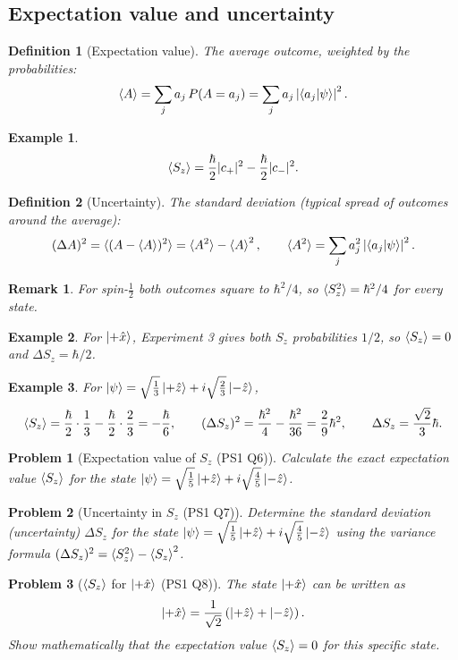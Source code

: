 \documentclass{article}
\newtheorem{definition}{Definition}
\newtheorem{problem}{Problem}
\newtheorem*{example}{Example}
\newtheorem{remark}{Remark}
\begin{document}
\subsection{Expectation value and uncertainty}
\begin{definition}[Expectation value]
    The average outcome, weighted by the probabilities:
    \begin{equation}
        \braket{A} = \sum_j a_j\,P(A = a_j) = \sum_j a_j\left|\braket{a_j|\psi}\right|^2.
    \end{equation}
\end{definition}
\begin{example}
    \[\braket{S_z} = \frac{\hbar}{2}|c_+|^2 - \frac{\hbar}{2}|c_-|^2.\]
\end{example}
\begin{definition}[Uncertainty]
    The standard deviation (typical spread of outcomes around the average):
    \begin{equation}
        (\Delta A)^2 = \braket{(A - \braket{A})^2} = \braket{A^2} - \braket{A}^2, \qquad \braket{A^2} = \sum_j a_j^2\left|\braket{a_j|\psi}\right|^2.
    \end{equation}
\end{definition}
\begin{remark}
    For spin-$\tfrac12$ both outcomes square to $\hbar^2/4$, so $\braket{S_z^2} = \hbar^2/4$ for every state.
\end{remark}
\begin{example}
    For $\ket{+\hat{x}}$, Experiment 3 gives both $S_z$ probabilities $1/2$, so $\braket{S_z} = 0$ and $\Delta S_z = \hbar/2$.
\end{example}
\begin{example}
    For $\ket{\psi} = \sqrt{\tfrac{1}{3}}\ket{+\hat{z}} + i\sqrt{\tfrac{2}{3}}\ket{-\hat{z}}$,
    \[\braket{S_z} = \frac{\hbar}{2}\cdot\frac{1}{3} - \frac{\hbar}{2}\cdot\frac{2}{3} = -\frac{\hbar}{6}, \qquad (\Delta S_z)^2 = \frac{\hbar^2}{4} - \frac{\hbar^2}{36} = \frac{2}{9}\hbar^2, \qquad \Delta S_z = \frac{\sqrt{2}}{3}\hbar.\]
\end{example}
\begin{problem}[Expectation value of $S_z$ (PS1 Q6)]
    Calculate the exact expectation value $\braket{S_z}$ for the state $\ket{\psi} = \sqrt{\tfrac{1}{5}}\ket{+\hat{z}} + i\sqrt{\tfrac{4}{5}}\ket{-\hat{z}}$.
\end{problem}
\begin{problem}[Uncertainty in $S_z$ (PS1 Q7)]
    Determine the standard deviation (uncertainty) $\Delta S_z$ for the state $\ket{\psi} = \sqrt{\tfrac{1}{5}}\ket{+\hat{z}} + i\sqrt{\tfrac{4}{5}}\ket{-\hat{z}}$ using the variance formula $(\Delta S_z)^2 = \braket{S_z^2} - \braket{S_z}^2$.
\end{problem}
\begin{problem}[$\braket{S_z}$ for $\ket{+\hat{x}}$ (PS1 Q8)]
    The state $\ket{+\hat{x}}$ can be written as
    \[\ket{+\hat{x}} = \frac{1}{\sqrt{2}}\left(\ket{+\hat{z}} + \ket{-\hat{z}}\right).\]
    Show mathematically that the expectation value $\braket{S_z} = 0$ for this specific state.
\end{problem}
\end{document}
